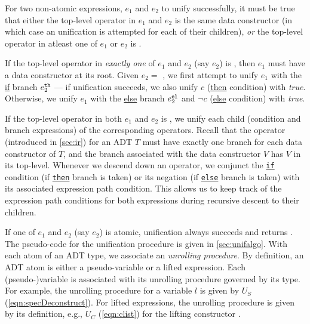 For two non-atomic expressions, $e_1$ and $e_2$ to unify successfully,
it must be true that either the top-level operator in $e_1$ and $e_2$ is
the same data constructor (in which case an unification is attempted for each
of their children), {\em or} the top-level operator in atleast one of $e_1$ or $e_2$ is \sumDtor{}.

If the top-level operator in {\em exactly one} of $e_1$ and $e_2$ (say $e_2$) is \sumDtor{},
then $e_1$ must have a data constructor at its root.
Given $e_2 = $   ,
we first attempt to unify $e_1$ with the \underline{if} branch $e_2^{\tt th}$ --- if unification succeeds,
we also unify $c$ (\underline{then} condition) with {\em true}.
Otherwise, we unify $e_1$ with the \underline{else} branch $e_2^{\tt el}$ and $\neg c$ (\underline{else} condition) with {\em true}.

If the top-level operator in both $e_1$ and $e_2$ is \sumDtor{},
we unify each child (condition and branch expressions) of the corresponding
\sumDtor{} operators.
Recall that the \sumDtor{} operator (introduced in \cref{sec:ir}) for an ADT $T$ must have exactly one branch
for each data constructor of $T$, and the branch associated with the data constructor $V$
has $V$ in its top-level.
Whenever we descend down an \sumDtor{} operator, we conjunct the \underline{\tt if} condition (if \underline{\tt then} branch is taken)
or its negation (if \underline{\tt else} branch is taken) with its associated expression path condition.
This allows us to keep track of the expression path conditions for both expressions
during recursive descent to their children.

If one of $e_1$ and $e_2$ (say $e_2$) is atomic,
unification always succeeds and returns .
The pseudo-code for the unification procedure is given in \cref{sec:unifalgo}.
With each atom of an ADT type, we associate an {\em unrolling procedure}.
By definition, an ADT atom is either a pseudo-variable or a lifted expression.
Each (pseudo-)variable is associated with its unrolling procedure governed by its type.
For example, the unrolling procedure for a  variable $l$ is given by $U_S$ (\cref{eqn:specDeconstruct}).
For lifted expressions, the unrolling procedure is given by its definition, e.g., $U_C$ (\cref{eqn:clist})
for the lifting constructor .

